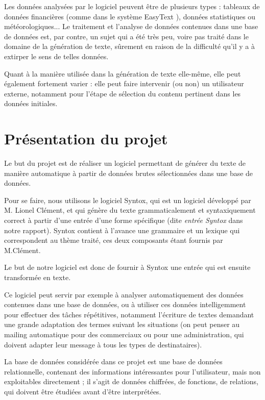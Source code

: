 \documentclass[12pt]{report}
\begin{document}
	\bigskip 
	Les données analysées par le logiciel peuvent être de plusieurs types : tableaux de données financières (comme dans le système EasyText \cite{Dan11}), données statistiques ou météorologiques... Le traitement et l'analyse de données contenues dans une base de données est, par contre, un sujet qui a été très peu, voire pas traité dans le domaine de la génération de texte, sûrement en raison de la difficulté qu'il y a à extirper le sens de telles données.
	
	Quant à la manière utilisée dans la génération de texte elle-même, elle peut également fortement varier : elle peut faire intervenir (ou non) un utilisateur externe, notamment pour l'étape de sélection du contenu pertinent dans les données initiales.


\section{Présentation du projet}

Le but du projet est de réaliser un logiciel permettant de générer du texte de manière automatique à partir de données brutes sélectionnées dans une base de données. 

Pour se faire, nous utilisons le logiciel Syntox, qui est un logiciel développé par M. Lionel Clément, et qui génère du texte grammaticalement et syntaxiquement correct à partir d'une entrée d'une forme spécifique (dite \emph{entrée Syntox} dans notre rapport).
Syntox contient à l'avance une grammaire et un lexique qui correspondent au thème traité, ces deux composants étant fournis par M.Clément.

Le but de notre logiciel est donc de fournir à Syntox une entrée qui est ensuite transformée en texte.

\bigskip

Ce logiciel peut servir par exemple à analyser automatiquement des données contenues dans une base de données, ou à utiliser ces données intelligemment pour effectuer des tâches répétitives, notamment l'écriture de textes demandant une grande adaptation des termes suivant les situations (on peut penser au mailing automatique pour des commerciaux ou pour une administration, qui doivent adapter leur message à tous les types de destinataires).

La base de données considérée dans ce projet est une base de données relationnelle, contenant des informations intéressantes pour l'utilisateur, mais non exploitables directement ; il s'agit de données chiffrées, de fonctions, de relations, qui doivent être étudiées avant d'être interprétées.
\end{document}
